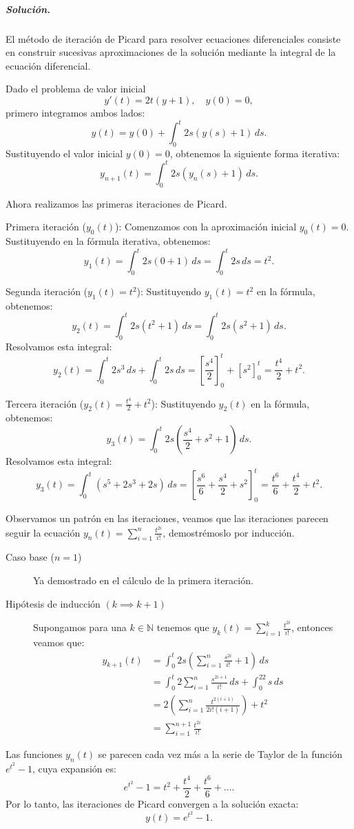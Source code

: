 \documentclass[12pt,letterpaper,oneside]{article}
\begin{document}
\subparagraph*{Solución.} El método de iteración de Picard para resolver ecuaciones diferenciales consiste en construir sucesivas aproximaciones de la solución mediante la integral de la ecuación diferencial.

Dado el problema de valor inicial
\[
y'(t) = 2t(y + 1), \quad y(0) = 0,
\]
primero integramos ambos lados:
\[
y(t) = y(0) + \int_0^t 2s(y(s) + 1)\,ds.
\]
Sustituyendo el valor inicial \(y(0) = 0\), obtenemos la siguiente forma iterativa:
\[
y_{n+1}(t) = \int_0^t 2s(y_n(s) + 1)\,ds.
\]

Ahora realizamos las primeras iteraciones de Picard.

Primera iteración (\(y_0(t)\)):
Comenzamos con la aproximación inicial \(y_0(t) = 0\). Sustituyendo en la fórmula iterativa, obtenemos:
\[
y_1(t) = \int_0^t 2s(0 + 1)\,ds = \int_0^t 2s\,ds = t^2.
\]

Segunda iteración (\(y_1(t) = t^2\)):
Sustituyendo \(y_1(t) = t^2\) en la fórmula, obtenemos:
\[
y_2(t) = \int_0^t 2s(t^2 + 1)\,ds = \int_0^t 2s(s^2 + 1)\,ds.
\]
Resolvamos esta integral:
\[
y_2(t) = \int_0^t 2s^3\,ds + \int_0^t 2s\,ds = \left[ \frac{s^4}{2} \right]_0^t + \left[ s^2 \right]_0^t = \frac{t^4}{2} + t^2.
\]

Tercera iteración (\(y_2(t) = \frac{t^4}{2} + t^2\)):
Sustituyendo \(y_2(t)\) en la fórmula, obtenemos:
\[
y_3(t) = \int_0^t 2s\left( \frac{s^4}{2} + s^2 + 1 \right)\,ds.
\]
Resolvamos esta integral:
\[
y_3(t) = \int_0^t \left( s^5 + 2s^3 + 2s \right)\,ds = \left[ \frac{s^6}{6} + \frac{s^4}{2} + s^2 \right]_0^t = \frac{t^6}{6} + \frac{t^4}{2} + t^2.
\]



Observamos un patrón en las iteraciones, veamos que las iteraciones parecen seguir la ecuación $y_n(t)=\sum_{i=1}^n\frac{t^{2i}}{i!}$, demostrémoslo por inducción.
\begin{description}
    \item[Caso base ($n=1$)] Ya demostrado en el cálculo de la primera iteración.
    \item[Hipótesis de inducción $(k\implies k+1)$] Supongamos para una $k\in\mathbb{N}$ tenemos que $y_k(t)=\sum_{i=1}^k \frac{t^{2i}}{i!}$, entonces veamos que:
    \begin{align*}
        y_{k+1}(t)&=\int_0^t2s\left(\sum_{i=1}^n \frac{s^{2i}}{i!}+1\right)\,ds\\
        &=\int_0^t2\sum_{i=1}^n\frac{s^{2i+1}}{i!}\,ds+\int_0^22s\,ds\\
        &=2\left(\sum_{i=1}^n\frac{t^{2(i+1)}}{2i!(i+1)}\right)+t^2\\
        &=\sum_{i=1}^{n+1}\frac{t^{2i}}{i!}
    \end{align*}
\end{description}
Las funciones \(y_n(t)\) se parecen cada vez más a la serie de Taylor de la función \(e^{t^2} - 1\), cuya expansión es:
\[
e^{t^2} - 1 = t^2 + \frac{t^4}{2} + \frac{t^6}{6} + \dots.
\]
Por lo tanto, las iteraciones de Picard convergen a la solución exacta:
\[
y(t) = e^{t^2} - 1.
\]
\end{document}
